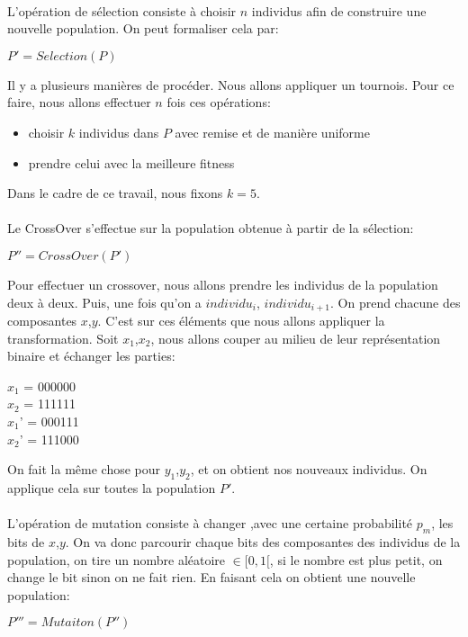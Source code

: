 \documentclass[a4paper, 11pt]{article}
\begin{document}
\paragraph{}
L'opération de sélection consiste à choisir $n$ individus afin de construire une nouvelle population. On peut formaliser cela par:
\begin{center}
 \begin{math}
  P' = Selection(P)
 \end{math}
\end{center}

Il y a plusieurs manières de procéder. Nous allons appliquer un tournois.
Pour ce faire, nous allons effectuer $n$ fois ces opérations:
\begin{itemize}
 \item choisir $k$ individus dans $P$ avec remise et de manière uniforme
 \item prendre celui avec la meilleure fitness
\end{itemize}

Dans le cadre de ce travail, nous fixons $k = 5$.

\paragraph{}
Le CrossOver s'effectue sur la population obtenue à partir de la sélection:
\begin{center}
 \begin{math}
  P'' = CrossOver(P')
 \end{math}
\end{center}

Pour effectuer un crossover, nous allons prendre les individus de la population deux à deux. Puis, une fois qu'on a $individu_i$,
$individu_{i+1}$. On prend chacune des composantes $x$,$y$. C'est sur ces éléments que nous allons appliquer la transformation.
Soit $x_1$,$x_2$, nous allons couper au milieu de leur représentation binaire et échanger les parties:
\begin{center}
 $x_1$ = 000000\\
 $x_2$ = 111111\\
 $x_1$' = 000111\\
 $x_2$' = 111000\\
\end{center}

On fait la même chose pour $y_1$,$y_2$, et on obtient nos nouveaux individus. On applique cela sur toutes la population $P'$.

\paragraph{}
L'opération de mutation consiste à changer ,avec une certaine probabilité $p_{m}$, les bits de $x$,$y$. On va donc parcourir chaque
bits des composantes des individus de la population, on tire un nombre aléatoire $\in [0,1[$, si le nombre est plus petit, on change le
bit sinon on ne fait rien.
En faisant cela on obtient une nouvelle population:
\begin{center}
 \begin{math}
  P''' = Mutaiton(P'')
 \end{math}
\end{center}
\end{document}
